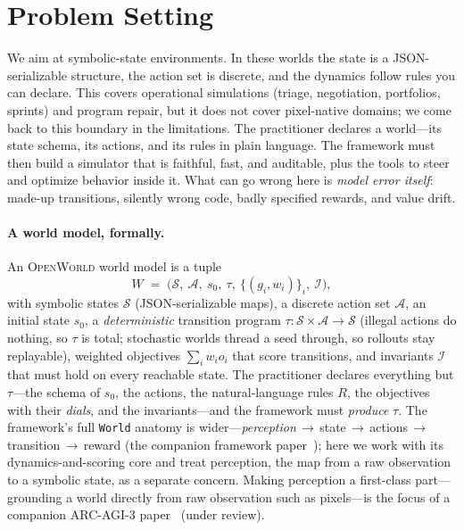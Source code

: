 \documentclass[11pt]{article}
\newcommand{\openworld}{\textsc{OpenWorld}}
\begin{document}
\section{Problem Setting}
We aim at symbolic-state environments. In these worlds the state is a
JSON-serializable structure, the action set is discrete, and the dynamics
follow rules you can declare. This covers operational simulations (triage,
negotiation, portfolios, sprints) and program repair, but it does not cover
pixel-native domains; we come back to this boundary in the limitations. The
practitioner declares a world---its state schema, its actions, and its rules
in plain language. The framework must then build a simulator that is faithful,
fast, and auditable, plus the tools to steer and optimize behavior inside it.
What can go wrong here is \emph{model error itself}: made-up transitions,
silently wrong code, badly specified rewards, and value drift.

\paragraph{A world model, formally.} An \openworld{} world model is a tuple
\[
  W \;=\; \bigl(\mathcal{S},\ \mathcal{A},\ s_0,\ \tau,\ \{(g_i, w_i)\}_i,\ \mathcal{I}\bigr),
\]
with symbolic states $\mathcal{S}$ (JSON-serializable maps), a discrete action set
$\mathcal{A}$, an initial state $s_0$, a \emph{deterministic} transition program
$\tau : \mathcal{S} \times \mathcal{A} \to \mathcal{S}$ (illegal actions do nothing, so $\tau$
is total; stochastic worlds thread a seed through, so rollouts stay replayable), weighted
objectives $\sum_i w_i o_i$ that score transitions, and invariants $\mathcal{I}$ that must
hold on every reachable state. The practitioner declares everything but $\tau$---the schema of
$s_0$, the actions, the natural-language rules $R$, the objectives with their \emph{dials},
and the invariants---and the framework must \emph{produce} $\tau$. The
framework's full \texttt{World} anatomy is wider---\emph{perception}\,$\to$\,state\,$\to$\,actions\,$\to$\,transition\,$\to$\,reward
(the companion framework paper~\cite{openworld_framework}); here we work with
its dynamics-and-scoring core and treat perception, the map from a raw
observation to a symbolic state, as a separate concern. Making perception a
first-class part---grounding a world directly from raw observation such as
pixels---is the focus of a companion ARC-AGI-3 paper~\cite{openworld_arc3} (under review).
\end{document}
